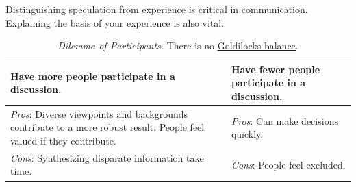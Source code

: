Distinguishing speculation from experience is critical in communication. Explaining the basis of your experience is also vital. 


\begin{center}
\begin{table}[H] %
\begin{tabular}{ | m{\dilemmatablewidth}| m{\dilemmatablewidth} | }
  \hline
  \textbf{Have more people participate in a discussion.} & 
  \textbf{Have fewer people participate in a discussion.} \\ 
  \hline
  \textit{Pros}: Diverse viewpoints and backgrounds contribute to a more robust result. People feel valued if they contribute. & 
  \textit{Pros}: Can make decisions quickly. \\  
  \hline
  \textit{Cons}: Synthesizing disparate information take time. & 
  \textit{Cons}: People feel excluded. \\  
  \hline
\end{tabular}
\caption{
\textit{Dilemma of Participants.}
There is no \href{https://en.wikipedia.org/wiki/Goldilocks_principle}{Goldilocks balance}.
}
\label{table:dilemma-how-many-participants}
\end{table}
\end{center}
 



